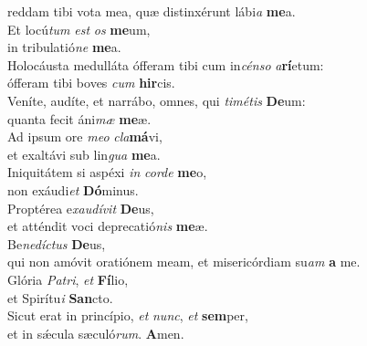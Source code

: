 \evenverse reddam tibi vota mea, quæ distinxérunt lábi\textit{a} \textbf{me}a.\\
\oddverse Et locú\textit{tum} \textit{est} \textit{os} \textbf{me}um,~\*\\
\oddverse in tribulatió\textit{ne} \textbf{me}a.\\
\evenverse Holocáusta medulláta ófferam tibi cum in\textit{cén}\textit{so} \textit{a}\textbf{rí}etum:~\*\\
\evenverse ófferam tibi boves \textit{cum} \textbf{hir}cis.\\
\oddverse Veníte, audíte, et narrábo, omnes, qui \textit{ti}\textit{mé}\textit{tis} \textbf{De}um:~\*\\
\oddverse quanta fecit áni\textit{mæ} \textbf{me}æ.\\
\evenverse Ad ipsum ore \textit{me}\textit{o} \textit{cla}\textbf{má}vi,~\*\\
\evenverse et exaltávi sub lin\textit{gua} \textbf{me}a.\\
\oddverse Iniquitátem si aspéxi \textit{in} \textit{cor}\textit{de} \textbf{me}o,~\*\\
\oddverse non exáudi\textit{et} \textbf{Dó}minus.\\
\evenverse Proptérea e\textit{xau}\textit{dí}\textit{vit} \textbf{De}us,~\*\\
\evenverse et atténdit voci deprecatió\textit{nis} \textbf{me}æ.\\
\oddverse Be\textit{ne}\textit{dí}\textit{ctus} \textbf{De}us,~\*\\
\oddverse qui non amóvit oratiónem meam, et misericórdiam su\textit{am} \textbf{a} me.\\
\evenverse Glória \textit{Pa}\textit{tri}, \textit{et} \textbf{Fí}lio,~\*\\
\evenverse et Spirítu\textit{i} \textbf{San}cto.\\
\oddverse Sicut erat in princípio, \textit{et} \textit{nunc}, \textit{et} \textbf{sem}per,~\*\\
\oddverse et in sǽcula sæculó\textit{rum}. \textbf{A}men.\\
